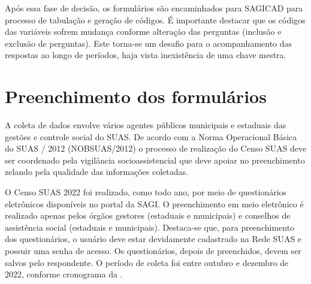 \documentclass[
  brazilian]{report}
\begin{document}
Após essa fase de decisão, os formulários são encaminhados para SAGICAD
para processo de tabulação e geração de códigos. É importante destacar
que os códigos das variáveis sofrem mudança conforme alteração das
perguntas (inclusão e exclusão de perguntas). Este torna-se um desafio
para o acompanhamento das respostas ao longo de períodos, haja vista
inexistência de uma chave mestra.

\hypertarget{preenchimento-dos-formuluxe1rios}{%
\section{Preenchimento dos
formulários}\label{preenchimento-dos-formuluxe1rios}}

A coleta de dados envolve vários agentes públicos municipais e estaduais
das gestões e controle social do SUAS. De acordo com a Norma Operacional
Básica do SUAS / 2012 (NOBSUAS/2012) o processo de realização do Censo
SUAS deve ser coordenado pela vigilância socioassistencial que deve
apoiar no preenchimento zelando pela qualidade das informações
coletadas.

O Censo SUAS 2022 foi realizado, como todo ano, por meio de
questionários eletrônicos disponíveis no portal da SAGI. O preenchimento
em meio eletrônico é realizado apenas pelos órgãos gestores (estaduais e
municipais) e conselhos de assistência social (estaduais e municipais).
Destaca-se que, para preenchimento dos questionários, o usuário deve
estar devidamente cadastrado na Rede SUAS e possuir uma senha de acesso.
Os questionários, depois de preenchidos, devem ser salvos pelo
respondente. O período de coleta foi entre outubro e dezembro de 2022,
conforme cronograma da .
\end{document}
